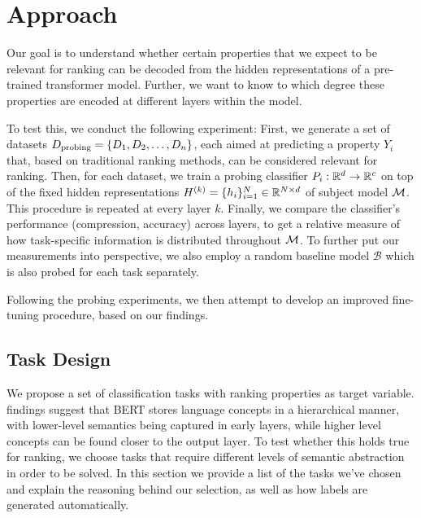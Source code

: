 \chapter{Approach}
\label{chap:approach}

Our goal is to understand whether certain properties that we expect to be relevant for ranking can be decoded from the hidden representations of a pre-trained transformer model. Further, we want to know to which degree these properties are encoded at different layers within the model.

To test this, we conduct the following experiment: First, we generate a set of datasets $D_{\text{probing}}=\{D_1, D_2, \dots, D_n \}$, each aimed at predicting a property $Y_i$ that, based on traditional ranking methods, can be considered relevant for ranking. Then, for each dataset, we train a probing classifier $P_i: \mathbb{R}^d \rightarrow \mathbb{R}^c$ on top of the fixed hidden representations $H^{(k)} = \{h_i\}_{i=1}^N \in \mathbb{R}^{N \times d}$ of subject model $\mathcal{M}$. This procedure is repeated at every layer $k$. Finally, we compare the classifier's performance (compression, accuracy) across layers, to get a relative measure of how task-specific information is distributed throughout $\mathcal{M}$. To further put our measurements into perspective, we also employ a random baseline model $\mathcal{B}$ which is also probed for each task separately.

Following the probing experiments, we then attempt to develop an improved fine-tuning procedure, based on our findings.

\section{Task Design}
\label{sec:tasks}


We propose a set of classification tasks with ranking properties as target variable. \cite{tenney-etal-2019-bert} findings suggest that BERT stores language concepts in a hierarchical manner, with lower-level semantics being captured in early layers, while higher level concepts can be found closer to the output layer. To test whether this holds true for ranking, we choose tasks that require different levels of semantic abstraction in order to be solved. In this section we provide a list of the tasks we've chosen and explain the reasoning behind our selection, as well as how labels are generated automatically.

